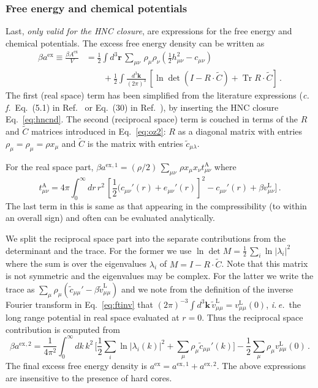 \documentclass[12pt,a4paper]{article}
\DeclareMathOperator{\Tr}{Tr}
\newcommand{\latin}[1]{\emph{#1}}
\newcommand{\cf}{\latin{c.\,f.}}
\newcommand{\ie}{\latin{i.\,e.}}
\newcommand{\half}{{\textstyle\frac{1}{2}}}
\newcommand{\myex}{^{\mathrm{ex}}}
\newcommand{\Aex}{A\myex}
\newcommand{\aex}{a\myex}
\newcommand{\myvec}[1]{{\mathbf #1}}
\newcommand{\rvec}{\myvec{r}}
\newcommand{\kvec}{\myvec{k}}
\newcommand{\lr}{^{\mathrm{L}}}
\newcommand{\Eqref}[1]{Eq.~\eqref{#1}}
\newcommand{\Refcite}[1]{Ref.~\cite{#1}}
\begin{document}
\subsubsection{Free energy and chemical potentials}\label{subsec:aex}
%
Last, \emph{only valid for the HNC closure}, are expressions for the
free energy and chemical potentials.  The excess free energy density
can be written as
%
\begin{equation}
  \begin{split}
    \beta\aex\equiv\frac{\beta\Aex}{V}&=\frac{1}{2}\int\!d^3\rvec\,
                        {\textstyle \sum_{\mu\nu}}\,\rho_\mu \rho_\nu
                        (\half h_{\mu\nu}^2-c_{\mu\nu})\\[6pt]
         &\qquad{}+ \frac{1}{2}\int\!\frac{d^3\kvec}{(2\pi)^3}\,
         [\ln\det(I-R\cdot {\tilde C})+ \Tr R\cdot {\tilde C} ]\,.
  \end{split}
\end{equation}
%
The first (real space) term has been simplified from the literature
expressions (\cf\ Eq.~(5.1) in \Refcite{Hir60} or Eq.~(30) in
\Refcite{LB94}), by inserting the HNC closure \Eqref{eq:hncnd}.  The
second (reciprocal space) term is couched in terms of the $R$ and
$\tilde C$ matrices introduced in \Eqref{eq:oz2}: $R$ as a diagonal
matrix with entries $\rho_\mu=\rho_\mu=\rho x_\mu$ and ${\tilde C}$ is
the matrix with entries ${\tilde c}_{\mu\lambda}$.

For the real space part,
$\beta\aex{}^{,1} = (\rho/2)\, {\textstyle \sum_{\mu\nu}}\,\rho x_\mu
x_\nu t^{\mathrm{A}}_{\mu\nu}$ where
%
\begin{equation}
  t^{\mathrm{A}}_{\mu\nu}={4\pi}\int_0^\infty\!\!dr\,r^2\,
  [\half (c_{\mu\nu}'(r)+e_{\mu\nu}'(r)]^2-
  c_{\mu\nu}'(r)+\beta v_{\mu\nu}\lr]\,.
\end{equation}
%
The last term in this is same as that appearing in the compressibility
(to within an overall sign) and often can be evaluated analytically.

We split the reciprocal space part into the separate contributions
from the determinant and the trace.  For the former we use $\ln\det
M=\half\,\sum_i\ln |\lambda_i|^2$ where the sum is over the
eigenvalues $\lambda_i$ of $M=I-R\cdot{\tilde C}$.  Note that this matrix is not
symmetric and the eigenvalues may be complex.  For the latter we write
the trace as $\sum_\mu \rho_\mu ({\tilde c}_{\mu\mu}'-\beta {\tilde
  v}_{\mu\mu}\lr)$ and we note from the definition of the inverse
Fourier transform in \Eqref{eq:ftinv} that $(2\pi)^{-3}\!\int\!
d^3\kvec\, {\tilde v}_{\mu\mu}\lr=v_{\mu\mu}\lr(0)$, \ie\ the long
range potential in real space evaluated at $r=0$.  Thus 
the reciprocal space contribution is computed from
%
\begin{equation}
  \beta\aex{}^{,2}=\frac{1}{4\pi^2}\int_0^\infty\!\!dk\,k^2\,
  \bigl[\half{\textstyle\sum_i}\ln|\lambda_i(k)|^2
    + {\textstyle\sum_\mu} \rho_\mu {\tilde c}_{\mu\mu}'(k)\bigr]
  -\half{\textstyle\sum_\mu} \rho_\mu v_{\mu\mu}\lr(0)\,.
\end{equation}
%
The final excess free energy density is $\aex = \aex{}^{,1} +
\aex{}^{,2}$.  The above expressions are insensitive to the presence
of hard cores.
\end{document}
